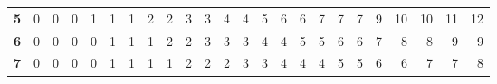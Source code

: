 \begin{table}[ht]
\begin{tabular}{|r|rrrrrrrrrrrrrrrrrrrrrrr}
\textbf{5}                                        & \cellcolor[HTML]{FFFFFF}0       & \cellcolor[HTML]{FFFFFF}0       & \cellcolor[HTML]{FFFFFF}0       & \cellcolor[HTML]{FFFFFF}1       & \cellcolor[HTML]{FFFFFF}1       & \cellcolor[HTML]{FFFFFF}1       & \cellcolor[HTML]{FBEAE8}2       & \cellcolor[HTML]{FBEAE8}2        & \cellcolor[HTML]{F7D4D1}3        & \cellcolor[HTML]{F7D4D1}3        & \cellcolor[HTML]{F3BEB9}4        & \cellcolor[HTML]{F3BEB9}4        & \cellcolor[HTML]{F3BAB5}5        & \cellcolor[HTML]{F3B5B0}6        & \cellcolor[HTML]{F3B5B0}6        & \cellcolor[HTML]{F2B1AB}7  & \cellcolor[HTML]{F2B1AB}7  & \cellcolor[HTML]{F2B1AB}7  & \cellcolor[HTML]{F2A8A1}9  & \cellcolor[HTML]{F1A39C}10 & \cellcolor[HTML]{F1A39C}10 & \cellcolor[HTML]{F19F97}11 & \cellcolor[HTML]{F19A92}12 \\ \cline{1-1}
\textbf{6}                                        & \cellcolor[HTML]{FFFFFF}0       & \cellcolor[HTML]{FFFFFF}0       & \cellcolor[HTML]{FFFFFF}0       & \cellcolor[HTML]{FFFFFF}0       & \cellcolor[HTML]{FFFFFF}1       & \cellcolor[HTML]{FFFFFF}1       & \cellcolor[HTML]{FFFFFF}1       & \cellcolor[HTML]{FBEAE8}2        & \cellcolor[HTML]{FBEAE8}2        & \cellcolor[HTML]{F7D4D1}3        & \cellcolor[HTML]{F7D4D1}3        & \cellcolor[HTML]{F7D4D1}3        & \cellcolor[HTML]{F3BEB9}4        & \cellcolor[HTML]{F3BEB9}4        & \cellcolor[HTML]{F3BAB5}5        & \cellcolor[HTML]{F3BAB5}5  & \cellcolor[HTML]{F3B5B0}6  & \cellcolor[HTML]{F3B5B0}6  & \cellcolor[HTML]{F2B1AB}7  & \cellcolor[HTML]{F2ACA6}8  & \cellcolor[HTML]{F2ACA6}8  & \cellcolor[HTML]{F2A8A1}9  & \cellcolor[HTML]{F2A8A1}9  \\ \cline{1-1}
\textbf{7}                                        & \cellcolor[HTML]{FFFFFF}0       & \cellcolor[HTML]{FFFFFF}0       & \cellcolor[HTML]{FFFFFF}0       & \cellcolor[HTML]{FFFFFF}0       & \cellcolor[HTML]{FFFFFF}1       & \cellcolor[HTML]{FFFFFF}1       & \cellcolor[HTML]{FFFFFF}1       & \cellcolor[HTML]{FFFFFF}1        & \cellcolor[HTML]{FBEAE8}2        & \cellcolor[HTML]{FBEAE8}2        & \cellcolor[HTML]{FBEAE8}2        & \cellcolor[HTML]{F7D4D1}3        & \cellcolor[HTML]{F7D4D1}3        & \cellcolor[HTML]{F3BEB9}4        & \cellcolor[HTML]{F3BEB9}4        & \cellcolor[HTML]{F3BEB9}4  & \cellcolor[HTML]{F3BAB5}5  & \cellcolor[HTML]{F3BAB5}5  & \cellcolor[HTML]{F3B5B0}6  & \cellcolor[HTML]{F3B5B0}6  & \cellcolor[HTML]{F2B1AB}7  & \cellcolor[HTML]{F2B1AB}7  & \cellcolor[HTML]{F2ACA6}8  \\ \cline{1-1}

\end{tabular}
\end{table}

